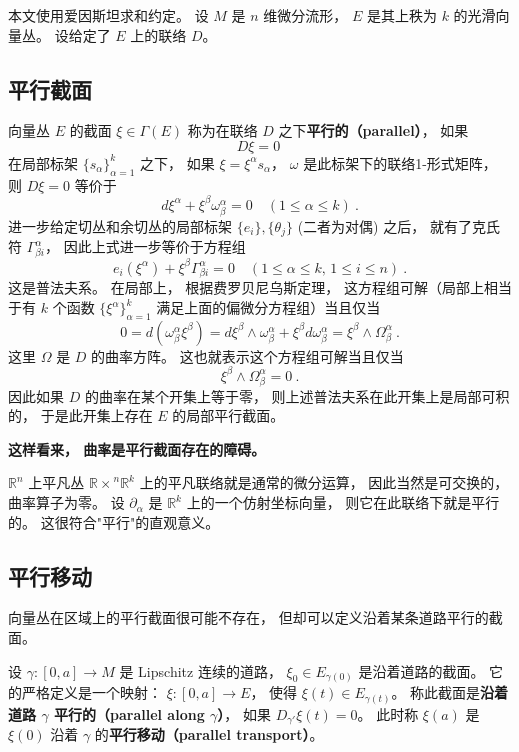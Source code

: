 

本文使用爱因斯坦求和约定。 设 $M$ 是 $n$ 维微分流形， $E$ 是其上秩为 $k$ 的光滑向量丛。 设给定了 $E$ 上的联络 $D$。

\subsection{平行截面}

向量丛 $E$ 的截面 $\xi\in\Gamma(E)$ 称为在联络 $D$ 之下\textbf{平行的（parallel）}， 如果
$$D\xi=0~$$
在局部标架 $\{s_\alpha\}_{\alpha=1}^k$ 之下， 如果 $\xi=\xi^\alpha s_\alpha$， $\omega$ 是此标架下的联络1-形式矩阵， 则 $D\xi=0$ 等价于
$$
d\xi^\alpha+\xi^\beta\omega^\alpha_\beta=0 \quad(1\leq \alpha\leq k)~.
$$
进一步给定切丛和余切丛的局部标架 $\{e_i\},\{\theta_j\}$ (二者为对偶) 之后， 就有了克氏符 $\Gamma_{\beta i}^\alpha$， 因此上式进一步等价于方程组
$$
e_i(\xi^\alpha)+\xi^\beta\Gamma^\alpha_{\beta i}=0\quad (1\leq \alpha\leq k,\,1\leq i\leq n)~.
$$
这是普法夫系。 在局部上， 根据费罗贝尼乌斯定理， 这方程组可解（局部上相当于有 $k$ 个函数 $\{\xi^\alpha\}_{\alpha=1}^k$ 满足上面的偏微分方程组）当且仅当
$$
0=d(\omega^\alpha_\beta\xi^\beta)=d\xi^\beta\wedge\omega^\alpha_\beta+\xi^\beta d\omega^\alpha_\beta=\xi^\beta\wedge\Omega_\beta^\alpha~.
$$
这里 $\Omega$ 是 $D$ 的曲率方阵。 这也就表示这个方程组可解当且仅当
$$
\xi^\beta\wedge\Omega_\beta^\alpha=0~.
$$
因此如果 $D$ 的曲率在某个开集上等于零， 则上述普法夫系在此开集上是局部可积的， 于是此开集上存在 $E$ 的局部平行截面。

\textbf{这样看来， 曲率是平行截面存在的障碍。}

$\mathbb{R}^n$ 上平凡丛 $\mathbb{R\times}^n\mathbb{R}^k$ 上的平凡联络就是通常的微分运算， 因此当然是可交换的， 曲率算子为零。 设 $\partial_\alpha$ 是 $\mathbb{R}^k$ 上的一个仿射坐标向量， 则它在此联络下就是平行的。 这很符合"平行"的直观意义。 

\subsection{平行移动}
向量丛在区域上的平行截面很可能不存在， 但却可以定义沿着某条道路平行的截面。 

设 $\gamma:[0,a]\to M$ 是 Lipschitz 连续的道路， $\xi_0\in E_{\gamma(0)}$ 是沿着道路的截面。 它的严格定义是一个映射： $\xi:[0,a]\to E$， 使得 $\xi(t)\in E_{\gamma(t)}$。 称此截面是\textbf{沿着道路 $\gamma$ 平行的（parallel along $\gamma$）}， 如果 $D_{\gamma'}\xi(t)=0$。 此时称 $\xi(a)$ 是 $\xi(0)$ 沿着 $\gamma$ 的\textbf{平行移动（parallel transport）}。

